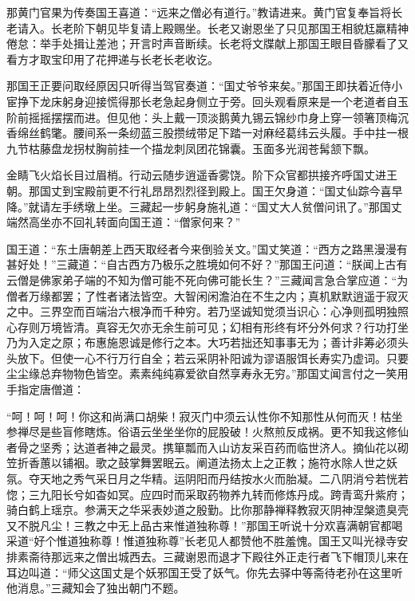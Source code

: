 \documentclass[12pt,UTF8]{ctexbook}
\begin{document}
{	那黄门官果为传奏国王喜道：“远来之僧必有道行。”教请进来。黄门官复奉旨将长老请入。长老阶下朝见毕复请上殿赐坐。长老又谢恩坐了只见那国王相貌尪羸精神倦怠：举手处揖让差池；开言时声音断续。长老将文牒献上那国王眼目昏朦看了又看方才取宝印用了花押递与长老长老收讫。
	
	那国王正要问取经原因只听得当驾官奏道：“国丈爷爷来矣。”那国王即扶着近侍小宦挣下龙床躬身迎接慌得那长老急起身侧立于旁。回头观看原来是一个老道者自玉阶前摇摇摆摆而进。但见他：头上戴一顶淡鹅黄九锡云锦纱巾身上穿一领箸顶梅沉香绵丝鹤氅。腰间系一条纫蓝三股攒绒带足下踏一对麻经葛纬云头履。手中拄一根九节枯藤盘龙拐杖胸前挂一个描龙刺凤团花锦囊。玉面多光润苍髯颔下飘。
	
	金睛飞火焰长目过眉梢。行动云随步逍遥香雾饶。阶下众官都拱接齐呼国丈进王朝。那国丈到宝殿前更不行礼昂昂烈烈径到殿上。国王欠身道：“国丈仙踪今喜早降。”就请左手绣墩上坐。三藏起一步躬身施礼道：“国丈大人贫僧问讯了。”那国丈端然高坐亦不回礼转面向国王道：“僧家何来？”
	
	国王道：“东土唐朝差上西天取经者今来倒验关文。”国丈笑道：“西方之路黑漫漫有甚好处！”三藏道：“自古西方乃极乐之胜境如何不好？”那国王问道：“朕闻上古有云僧是佛家弟子端的不知为僧可能不死向佛可能长生？”三藏闻言急合掌应道：“为僧者万缘都罢；了性者诸法皆空。大智闲闲澹泊在不生之内；真机默默逍遥于寂灭之中。三界空而百端治六根净而千种穷。若乃坚诚知觉须当识心：心净则孤明独照心存则万境皆清。真容无欠亦无余生前可见；幻相有形终有坏分外何求？行功打坐乃为入定之原；布惠施恩诚是修行之本。大巧若拙还知事事无为；善计非筹必须头头放下。但使一心不行万行自全；若云采阴补阳诚为谬语服饵长寿实乃虚词。只要尘尘缘总弃物物色皆空。素素纯纯寡爱欲自然享寿永无穷。”那国丈闻言付之一笑用手指定唐僧道：
	
	“呵！呵！呵！你这和尚满口胡柴！寂灭门中须云认性你不知那性从何而灭！枯坐参禅尽是些盲修瞎炼。俗语云坐坐坐你的屁股破！火熬煎反成祸。更不知我这修仙者骨之坚秀；达道者神之最灵。携箪瓢而入山访友采百药而临世济人。摘仙花以砌笠折香蕙以铺裀。歌之鼓掌舞罢眠云。阐道法扬太上之正教；施符水除人世之妖氛。夺天地之秀气采日月之华精。运阴阳而丹结按水火而胎凝。二八阴消兮若恍若惚；三九阳长兮如杳如冥。应四时而采取药物养九转而修炼丹成。跨青鸾升紫府；骑白鹤上瑶京。参满天之华采表妙道之殷勤。比你那静禅释教寂灭阴神涅槃遗臭壳又不脱凡尘！三教之中无上品古来惟道独称尊！”那国王听说十分欢喜满朝官都喝采道“好个惟道独称尊！惟道独称尊”长老见人都赞他不胜羞愧。国王又叫光禄寺安排素斋待那远来之僧出城西去。三藏谢恩而退才下殿往外正走行者飞下帽顶儿来在耳边叫道：“师父这国丈是个妖邪国王受了妖气。你先去驿中等斋待老孙在这里听他消息。”三藏知会了独出朝门不题。
	
}
\end{document}
